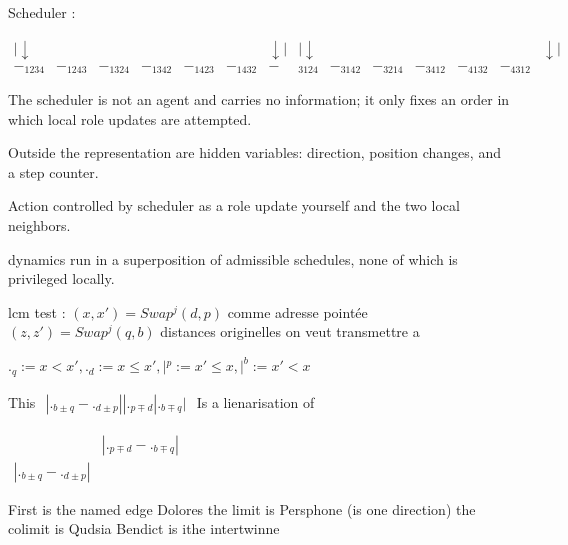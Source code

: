 \documentclass{article}
\begin{document}
Scheduler :

 
${\scriptscriptstyle
{
\begin{array}{lccccccccccccl}
|\downarrow &&&&&& \downarrow | & |\downarrow &&&&&& \downarrow |\\ 
-_{1234} & -_{1243} & -_{1324} & -_{1342} & -_{1423} & -_{1432} & -&_{3124} & -_{3142} & -_{3214} & -_{3412} & -_{4132} & -_{4312}
\end{array}}}$


The scheduler is not an agent and carries no information; it only fixes an order in which local role updates are attempted.

Outside the representation are hidden variables: direction, position changes, and a step counter.


 Action controlled by scheduler  as a role update yourself and the two local neighbors.

dynamics run in a superposition of admissible schedules, none of which is privileged locally.


lcm test : $ (x,x') = Swap^j (d,p)$   comme adresse pointée $(z,z' )=Swap^j(q,b)$ distances originelles
on veut transmettre a

$._q:= x<x', ._d:= x\le x' , |^p:= x'\le x ,|^b:= x'<x$
 
          This    
             $
             \begin{matrix}     
             | ._{b\pm q}  - ._{d\pm p} || ._{p \mp d} |    ._{b\mp q}|
             \end{matrix}
             $
             Is a lienarisation of
             
               $
             \begin{matrix}     
             &| ._{p \mp d} -    ._{b\mp q}|\\
             | ._{b\pm q}  - ._{d\pm p} |&
             \end{matrix}
             $
             
             
 First is the named edge  Dolores the limit is Persphone (is one direction) the colimit is Qudsia
 Bendict is ithe intertwinne
 
\end{document}
